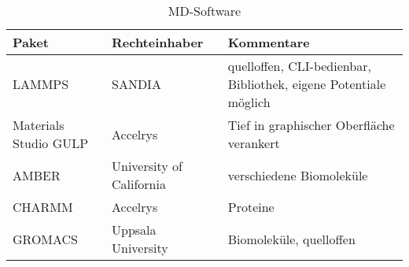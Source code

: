 \begin{table}
  \begin{tabularx}{\textwidth}{llX}
    \hline
    Paket & Rechteinhaber & Kommentare \\
    \hline
    LAMMPS & SANDIA & quelloffen, CLI-bedienbar, Bibliothek, eigene Potentiale möglich \\
    Materials Studio GULP & Accelrys & Tief in graphischer Oberfläche verankert \\
    AMBER & University of California & verschiedene Biomoleküle \\
    CHARMM & Accelrys & Proteine \\
    GROMACS & Uppsala University & Biomoleküle, quelloffen \\
    \hline
  \end{tabularx}
  \caption[MD-Software]{MD-Software}
  \label{tab:mdsoftware}
\end{table}

